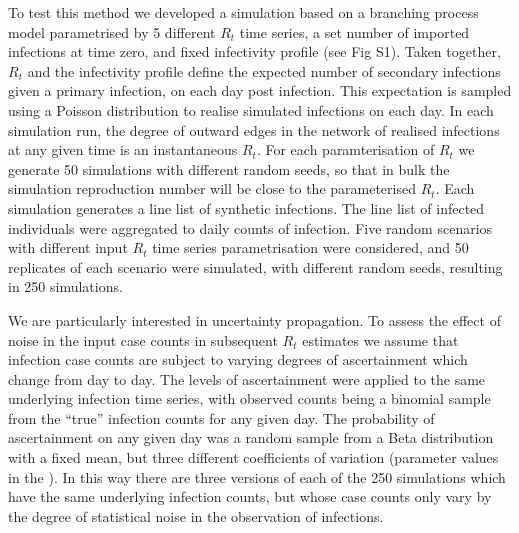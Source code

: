 \documentclass[10pt,letterpaper]{article}
\begin{document}
To test this method we developed a simulation based on a branching process model parametrised by 5 different $R_t$ time series, a set number of imported infections at time zero, and fixed infectivity profile (see  Fig S1). Taken together, $R_t$ and the infectivity profile define the expected number of secondary infections given a primary infection, on each day post infection. This expectation is sampled using a Poisson distribution to realise simulated infections on each day. In each simulation run, the degree of outward edges in the network of realised infections at any given time is an instantaneous $R_t$. For each paramterisation of $R_t$ we generate 50 simulations with different random seeds, so that in bulk the simulation reproduction number will be close to the parameterised $R_t$. Each simulation generates a line list of synthetic infections. The line list of infected individuals were aggregated to daily counts of infection. Five random scenarios with different input $R_t$ time series parametrisation were considered, and 50 replicates of each scenario were simulated, with different random seeds, resulting in 250 simulations.

We are particularly interested in uncertainty propagation. To assess the effect of noise in the input case counts in subsequent $R_t$ estimates we assume that infection case counts are subject to varying degrees of ascertainment which change from day to day. The levels of ascertainment were applied to the same underlying infection time series, with observed counts being a binomial sample from the ``true'' infection counts for any given day. The probability of ascertainment on any given day was a random sample from a Beta distribution with a fixed mean, but three different coefficients of variation (parameter values in the ). In this way there are three versions of each of the 250 simulations which have the same underlying infection counts, but whose case counts only vary by the degree of statistical noise in the observation of infections.
\end{document}
